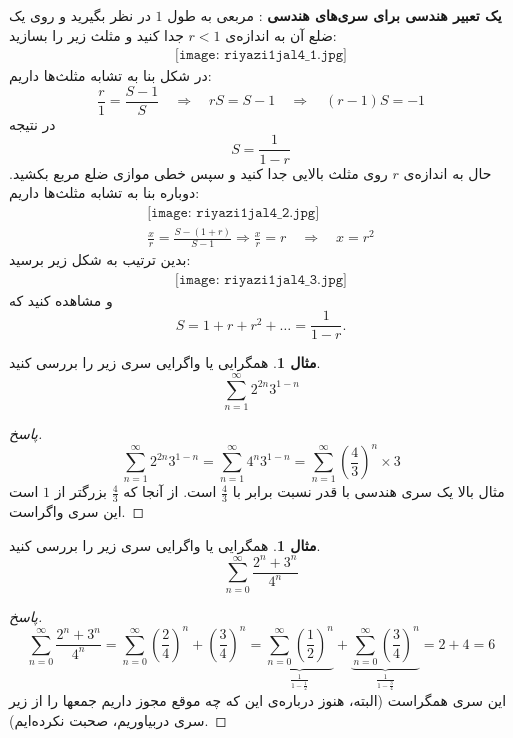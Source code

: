 \documentclass[12pt,a4paper]{article}
\theoremstyle{definition}
\newtheorem{mesal}[thm]{مثال}
\begin{document}
\noindent
\textbf{یک تعبیر هندسی برای سری‌های هندسی}
: مربعی به طول 
$1$
در نظر بگیرید و روی یک ضلع آن به اندازه‌ی 
$r<1$
جدا کنید و مثلث زیر را بسازید:
\begin{align*}
\texttt{[image: riyazi1jal4\_1.jpg]}
\end{align*}
در شکل بنا به تشابه مثلث‌ها داریم:
\[
\frac{r}{1}=\frac{S-1}{S} \quad \Rightarrow \quad rS=S-1 \quad \Rightarrow \quad (r-1)S=-1
\]
در نتیجه 
\[
S=\frac{1}{1-r}
\]
حال به اندازه‌ی 
$r$
روی مثلث بالایی جدا کنید  و سپس خطی موازی ضلع مربع بکشید. دوباره بنا به تشابه مثلث‌ها داریم:
\begin{align*}
\texttt{[image: riyazi1jal4\_2.jpg]}
\\
\frac{x}{r}=\frac{S-(1+r)}{S-1}\Rightarrow
\frac{x}{r}=r \quad \Rightarrow \quad x=r^2
\end{align*}
بدین ترتیب به شکل زیر برسید:
\begin{align*}
\texttt{[image: riyazi1jal4\_3.jpg]}
\end{align*}
و مشاهده کنید که
\[
S=1+r+r^2+\ldots = \frac{1}{1-r}.
\]
\begin{mesal}
همگرایی یا واگرایی سری زیر را بررسی کنید.
\[
\sum_{n=1}^{\infty} 2^{2n} 3^{1-n}
\]
\end{mesal}
\begin{proof}[پاسخ]
\[
\sum_{n=1}^{\infty} 2^{2n} 3^{1-n}= \sum_{n=1}^{\infty} 4^{n} 3^{1-n}=\sum_{n=1}^{\infty} (\frac{4}{3})^{n} \times 3
\]
مثال بالا یک سری هندسی با قدر نسبت برابر با
$\frac{4}{3}$
است. 
از آنجا که 
$\frac{4}{3}$
بزرگتر از 
$1$
است 
این سری واگراست.
\end{proof}
\begin{mesal}
همگرایی یا واگرایی سری زیر را بررسی کنید.
\[
\sum_{n=0}^{\infty} \frac{2^n+3^n}{4^n}
\]
\end{mesal}
\begin{proof}[پاسخ]
\[
\sum_{n=0}^{\infty} \frac{2^n+3^n}{4^n}=\sum_{n=0}^{\infty} (\frac{2}{4})^n + (\frac{3}{4})^n=\underbrace{\sum_{n=0}^{\infty} (\frac{1}{2})^n}_{\frac{1}{1-\frac{1}{2}}} + \underbrace{\sum_{n=0}^{\infty}(\frac{3}{4})^n}_{\frac{1}{1-\frac{3}{4}}}=2+4=6
\]
این سری همگراست (البته، هنوز درباره‌ی این که چه موقع مجوز داریم جمعها را از زیر سری دربیاوریم، صحبت نکرده‌ایم).
\end{proof}
\end{document}
